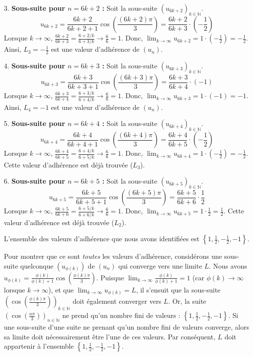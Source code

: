 \documentclass{report}
\begin{document}
3.  \textbf{Sous-suite pour $n=6k+2$ :}
    Soit la sous-suite $(u_{6k+2})_{k \in \mathbb{N}}$.
    $$u_{6k+2} = \frac{6k+2}{6k+2+1} \cos\left(\frac{(6k+2)\pi}{3}\right) = \frac{6k+2}{6k+3} \cdot \left(-\frac{1}{2}\right)$$
    Lorsque $k \to \infty$, $\frac{6k+2}{6k+3} = \frac{6 + 2/k}{6 + 3/k} \to \frac{6}{6} = 1$.
    Donc, $\lim_{k \to \infty} u_{6k+2} = 1 \cdot \left(-\frac{1}{2}\right) = -\frac{1}{2}$.
    Ainsi, $L_3 = -\frac{1}{2}$ est une valeur d'adhérence de $(u_n)$.

4.  \textbf{Sous-suite pour $n=6k+3$ :}
    Soit la sous-suite $(u_{6k+3})_{k \in \mathbb{N}}$.
    $$u_{6k+3} = \frac{6k+3}{6k+3+1} \cos\left(\frac{(6k+3)\pi}{3}\right) = \frac{6k+3}{6k+4} \cdot (-1)$$
    Lorsque $k \to \infty$, $\frac{6k+3}{6k+4} = \frac{6 + 3/k}{6 + 4/k} \to \frac{6}{6} = 1$.
    Donc, $\lim_{k \to \infty} u_{6k+3} = 1 \cdot (-1) = -1$.
    Ainsi, $L_4 = -1$ est une valeur d'adhérence de $(u_n)$.

5.  \textbf{Sous-suite pour $n=6k+4$ :}
    Soit la sous-suite $(u_{6k+4})_{k \in \mathbb{N}}$.
    $$u_{6k+4} = \frac{6k+4}{6k+4+1} \cos\left(\frac{(6k+4)\pi}{3}\right) = \frac{6k+4}{6k+5} \cdot \left(-\frac{1}{2}\right)$$
    Lorsque $k \to \infty$, $\frac{6k+4}{6k+5} = \frac{6 + 4/k}{6 + 5/k} \to \frac{6}{6} = 1$.
    Donc, $\lim_{k \to \infty} u_{6k+4} = 1 \cdot \left(-\frac{1}{2}\right) = -\frac{1}{2}$.
    Cette valeur d'adhérence est déjà trouvée ($L_3$).

6.  \textbf{Sous-suite pour $n=6k+5$ :}
    Soit la sous-suite $(u_{6k+5})_{k \in \mathbb{N}}$.
    $$u_{6k+5} = \frac{6k+5}{6k+5+1} \cos\left(\frac{(6k+5)\pi}{3}\right) = \frac{6k+5}{6k+6} \cdot \frac{1}{2}$$
    Lorsque $k \to \infty$, $\frac{6k+5}{6k+6} = \frac{6 + 5/k}{6 + 6/k} \to \frac{6}{6} = 1$.
    Donc, $\lim_{k \to \infty} u_{6k+5} = 1 \cdot \frac{1}{2} = \frac{1}{2}$.
    Cette valeur d'adhérence est déjà trouvée ($L_2$).

L'ensemble des valeurs d'adhérence que nous avons identifiées est $\left\{1, \frac{1}{2}, -\frac{1}{2}, -1\right\}$.

Pour montrer que ce sont \textit{toutes} les valeurs d'adhérence, considérons une sous-suite quelconque $(u_{\phi(k)})$ de $(u_n)$ qui converge vers une limite $L$.
Nous avons $u_{\phi(k)} = \frac{\phi(k)}{\phi(k)+1} \cos\left(\frac{\phi(k)\pi}{3}\right)$.
Puisque $\lim_{k \to \infty} \frac{\phi(k)}{\phi(k)+1} = 1$ (car $\phi(k) \to \infty$ lorsque $k \to \infty$), et que $\lim_{k \to \infty} u_{\phi(k)} = L$, il s'ensuit que la sous-suite $\left(\cos\left(\frac{\phi(k)\pi}{3}\right)\right)_{k \in \mathbb{N}}$ doit également converger vers $L$.
Or, la suite $\left(\cos\left(\frac{n\pi}{3}\right)\right)_{n \in \mathbb{N}}$ ne prend qu'un nombre fini de valeurs : $\left\{1, \frac{1}{2}, -\frac{1}{2}, -1\right\}$.
Si une sous-suite d'une suite ne prenant qu'un nombre fini de valeurs converge, alors sa limite doit nécessairement être l'une de ces valeurs.
Par conséquent, $L$ doit appartenir à l'ensemble $\left\{1, \frac{1}{2}, -\frac{1}{2}, -1\right\}$.
\end{document}
